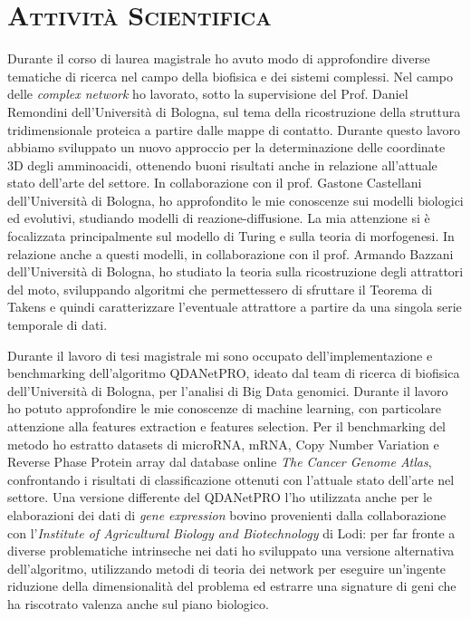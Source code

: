 \documentclass[a4paper,11pt]{article}
\begin{document}
\vspace*{0.5cm}
\section*{\scshape{Attività Scientifica}}

Durante il corso di laurea magistrale ho avuto modo di approfondire diverse tematiche di ricerca nel campo della biofisica e dei sistemi complessi.
Nel campo delle \emph{complex network} ho lavorato, sotto la supervisione del Prof. Daniel Remondini dell'Università di Bologna, sul tema della ricostruzione della struttura tridimensionale proteica a partire dalle mappe di contatto.
Durante questo lavoro abbiamo sviluppato un nuovo approccio per la determinazione delle coordinate 3D degli amminoacidi, ottenendo buoni risultati anche in relazione all'attuale stato dell'arte del settore.
In collaborazione con il prof. Gastone Castellani dell'Università di Bologna, ho approfondito le mie conoscenze sui modelli biologici ed evolutivi, studiando modelli di reazione-diffusione.
La mia attenzione si è focalizzata principalmente sul modello di Turing e sulla teoria di morfogenesi.
In relazione anche a questi modelli, in collaborazione con il prof. Armando Bazzani dell'Università di Bologna, ho studiato la teoria sulla ricostruzione degli attrattori del moto, sviluppando algoritmi che permettessero di sfruttare il Teorema di Takens e quindi caratterizzare l'eventuale attrattore a partire da una singola serie temporale di dati.

Durante il lavoro di tesi magistrale mi sono occupato dell'implementazione e benchmarking dell'algoritmo QDANetPRO, ideato dal team di ricerca di biofisica dell'Università di Bologna, per l'analisi di Big Data genomici.
Durante il lavoro ho potuto approfondire le mie conoscenze di machine learning, con particolare attenzione alla features extraction e features selection.
Per il benchmarking del metodo ho estratto datasets di microRNA, mRNA, Copy Number Variation e Reverse Phase Protein array dal database online \emph{The Cancer Genome Atlas}, confrontando i risultati di classificazione ottenuti con l'attuale stato dell'arte nel settore.
Una versione differente del QDANetPRO l'ho utilizzata anche per le elaborazioni dei dati di \emph{gene expression} bovino provenienti dalla collaborazione con l'\emph{Institute of Agricultural Biology and Biotechnology} di Lodi: per far fronte a diverse problematiche intrinseche nei dati ho sviluppato una versione alternativa dell'algoritmo, utilizzando metodi di teoria dei network per eseguire un'ingente riduzione della dimensionalità del problema ed estrarre una signature di geni che ha riscotrato valenza anche sul piano biologico.
\end{document}
